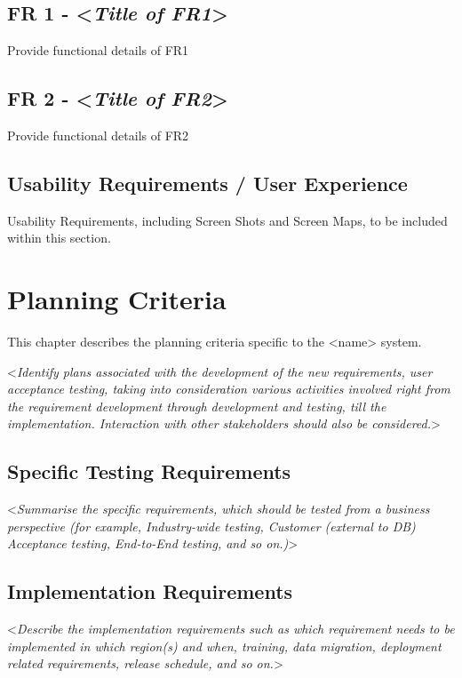 \documentclass[english,12pt]{scrartcl}
\newcommand{\comment}[1]{\textless\textit{#1}\textgreater\vspace*{1ex}}
\begin{document}
 
\subsection{FR 1 - \comment{Title of FR1}}
 
Provide functional details of FR1
 
\subsection{FR 2 - \comment{Title of FR2}}
 
Provide functional details of FR2
 
\subsection{Usability Requirements / User Experience}
 
Usability Requirements, including Screen Shots and Screen Maps, to be included within this section.
 
\section{Planning Criteria}
This chapter describes the planning criteria specific to the <name> system.
 
\comment{Identify plans associated with the development of the new requirements, user acceptance testing, taking into consideration various activities involved right from the requirement development through development and testing, till the implementation. Interaction with other stakeholders should also be considered.}
 
\subsection{Specific Testing Requirements}
 
\comment{Summarise the specific requirements, which should be tested from a business perspective (for example, Industry-wide testing, Customer (external to DB) Acceptance testing, End-to-End testing, and so on.)}
 
\subsection{Implementation Requirements}
 
\comment{Describe the implementation requirements such as which requirement needs to be implemented in which region(s) and when, training, data migration, deployment related requirements, release schedule, and so on.}
 
\end{document}
